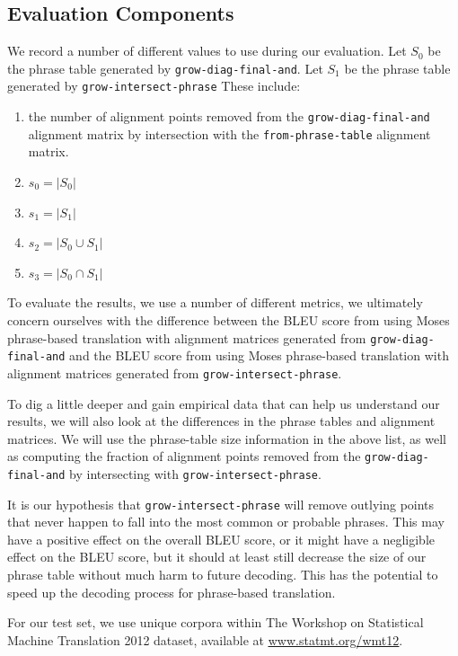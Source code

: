 \documentclass[twocolumn]{article}
\newcommand{\linespacing}{
  \onehalfspacing
}
\newcommand{\originalAlign}{\texttt{grow-diag-final-and}}
\newcommand{\phraseAlign}{\texttt{from-phrase-table}}
\newcommand{\phraseIntersectAlign}{\texttt{grow-intersect-phrase}}
\newcommand{\wrapSingleSpacing}[1]{
  \singlespacing
  #1
  \linespacing{}
}
\begin{document}
\subsection{Evaluation Components}
We record a number of different values to use during our evaluation.
Let $S_0$ be the phrase table generated by \originalAlign{}.
Let $S_1$ be the phrase table generated by \phraseIntersectAlign{}
These include:
\wrapSingleSpacing{
\begin{enumerate}
  \item the number of alignment points removed from
    the \originalAlign{} alignment matrix
    by intersection with
    the \phraseAlign{} alignment matrix.
  \item $s_0 = |S_0|$
  \item $s_1 = |S_1|$
  \item $s_2 = |S_0 \cup S_1|$
  \item $s_3 = |S_0 \cap S_1|$
\end{enumerate}
}

To evaluate the results, we use a number of different metrics, we ultimately
concern ourselves with the difference between the BLEU score from using Moses
phrase-based translation with alignment matrices generated from \originalAlign{}
and the BLEU score from using Moses phrase-based translation with alignment
matrices generated from \phraseIntersectAlign{}.

To dig a little deeper and gain empirical data that can help us understand our
results, we will also look at the differences in the phrase tables and alignment
matrices. We will use the phrase-table size information in the above list, as
well as computing the fraction of alignment points removed from the
\originalAlign{} by intersecting with \phraseIntersectAlign{}.

It is our hypothesis that \phraseIntersectAlign{} will remove outlying
points that never happen to fall into the most common or probable phrases. This
may have a positive effect on the overall BLEU score, or it might have a
negligible effect on the BLEU score, but it should at least still decrease the
size of our phrase table without much harm to future decoding. This has the
potential to speed up the decoding process for phrase-based translation.

For our test set, we use unique corpora within
The Workshop on Statistical Machine Translation 2012 dataset,
available at
\href{http://www.statmt.org/wmt12/dev.tgz}
     {\underline{www.statmt.org/wmt12}}.
\end{document}

